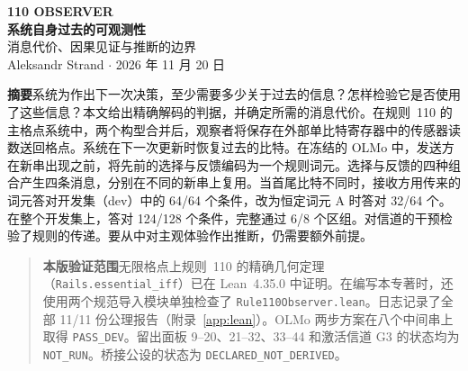 \documentclass[11pt,a4paper]{article}
\theoremstyle{definition}
\begin{document}
\sloppy
\begin{center}
{\small\bfseries\color{accent}110 OBSERVER}\\[7pt]
{\LARGE\bfseries 系统自身过去的可观测性}\\[5pt]
{\large 消息代价、因果见证与推断的边界}\\[10pt]
Aleksandr Strand \hspace{1em} $\cdot$ \hspace{1em} 2026 年 11 月 20 日
\end{center}
\noindent\textbf{摘要}\quad 系统为作出下一次决策，至少需要多少关于过去的信息？怎样检验它是否使用了这些信息？本文给出精确解码的判据，并确定所需的消息代价。在规则~110 的主格点系统中，两个构型合并后，观察者将保存在外部单比特寄存器中的传感器读数送回格点。系统在下一次更新时恢复过去的比特。在冻结的 OLMo 中，发送方在新串出现之前，将先前的选择与反馈编码为一个规则词元。选择与反馈的四种组合产生四条消息，分别在不同的新串上复用。当首尾比特不同时，接收方用传来的词元答对开发集（dev）中的 64/64 个条件，改为恒定词元 A 时答对 32/64 个。在整个开发集上，答对 124/128 个条件，完整通过 6/8 个区组。对信道的干预检验了规则的传递。要从中对主观体验作出推断，仍需要额外前提。

\begin{quote}\small\raggedright
\textbf{本版验证范围}\quad 无限格点上规则~110 的精确几何定理（\texttt{Rails.essential\_iff}）已在 Lean~4.35.0 中证明。在编写本专著时，还使用两个规范导入模块单独检查了 \texttt{Rule110Observer.lean}。日志记录了全部 11/11 份公理报告（附录~\ref{app:lean}）。OLMo 两步方案在八个中间串上取得 \texttt{PASS\_DEV}。留出面板 9--20、21--32、33--44 和激活信道 G3 的状态均为 \texttt{NOT\_RUN}。桥接公设的状态为 \texttt{DECLARED\_NOT\_DERIVED}。
\end{quote}

\end{document}
